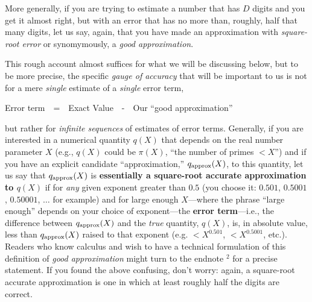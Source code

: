 \documentclass[openany]{book}
\theoremstyle{plain}
\theoremstyle{definition}
\begin{document}
More generally, if you are trying to estimate a number that has $D$
digits and you get it almost right, but with an error that has no more
than, roughly, half that many digits, let us say, again, that you have
made an approximation with {\em square-root error} or synomymously, a
{\em good approximation}.


This rough account almost suffices for what we will be discussing
below, but to be more precise, the specific {\em gauge of accuracy}
that will be important to us is not for a mere {\em single} estimate
of a {\em single} error term, 
 
 \centerline{Error term\ \  =\ \    Exact Value\ \   -\ \   Our ``good  approximation''}
  
 
 
 \noindent but rather for {\em infinite sequences} of estimates of
 error terms. Generally, if you are interested in a numerical quantity
 $q(X)$ that depends on the real number parameter $X$ (e.g., $q(X)$
 could be $\pi(X)$, ``the number of primes $< X$'') and if you have an
 explicit candidate ``approximation,'' $q_{\rm approx}(X)$, to this
 quantity, let us say that $q_{\rm approx}(X)$ is {\bf essentially a
   square-root accurate approximation to $q(X)$} if for {\em any}
 given exponent greater than $0.5$ (you choose it: $0.501$, $0.5001$,
 $0.50001$, $\dots$ for example) and for large enough $X$---where the
 phrase ``large enough'' depends on your choice of exponent---the {\bf
   error term}---i.e., the difference between $q_{\rm approx}(X)$ and
 the {\em true} quantity, $q(X)$, is, in absolute value, less than
 $q_{\rm approx}(X)$ raised to that exponent (e.g. $< X^{0.501}$, $<
 X^{0.5001}$, etc.). Readers who know calculus and wish to have a
 technical formulation of this definition of {\em good approximation}
 might turn to the endnote $^2$ for a precise statement.
If you found the above confusing, don't worry: again, a 
square-root accurate approximation is one in which at least roughly
half the digits are correct.
 
\end{document}
